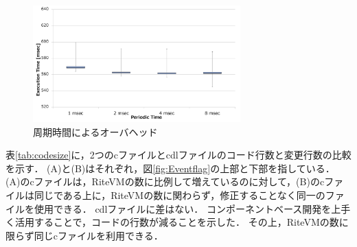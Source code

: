 \documentclass[submit,techrep]{ipsj}
\begin{document}

\begin{figure}[t]
    \centering
    \includegraphics[width=8cm,clip]{../EMSOFT2016/figure/comparison_msec.pdf}
    \vspace{-2mm}
    \caption{周期時間によるオーバヘッド}
\vspace{-3mm}
    \label{fig:comparison_msec}
\end{figure}

表\ref{tab:codesize}に，2つのcファイルとcdlファイルのコード行数と変更行数の比較を示す．
(A)と(B)はそれぞれ，図\ref{fig:Eventflag}の上部と下部を指している．
(A)のcファイルは，RiteVMの数に比例して増えているのに対して，(B)のcファイルは同じである上に，RiteVMの数に関わらず，修正することなく同一のファイルを使用できる．
cdlファイルに差はない．
コンポーネントベース開発を上手く活用することで，コードの行数が減ることを示した．%
その上，RiteVMの数に限らず同じcファイルを利用できる．%

\end{document}
